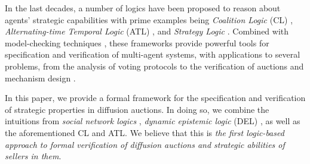 \documentclass[letterpaper]{article} %
\theoremstyle{definition}
\newcommand{\munyque}[1]{{[\color{red}#1]}}
\newcommand{\laurent}[1]{{[\color{purple}#1]}}
\begin{document}
In the last decades, a number of logics have been proposed to reason about agents' %
strategic capabilities with prime examples being %
\textit{Coalition Logic} (CL) \cite{pauly02},   \textit{Alternating-time Temporal Logic} (ATL) \cite{alur2002}, and \textit{Strategy Logic}  \cite{MogaveroMPV14}.
Combined with model-checking techniques \cite{clarke2018handbook}, these frameworks provide powerful tools for specification and verification of multi-agent systems, with applications to several problems, from   %
the %
analysis of voting protocols \cite{BelardinelliCDJ21,JamrogaKM22} to the verification of auctions and  mechanism design \cite{MittelmannAIJ2025,MittelmannMMP23}.

In this paper, we provide a formal framework for the specification and verification of strategic properties in diffusion auctions. In doing so, we combine the intuitions from \textit{social network logics} \cite{minathesis}, \textit{dynamic epistemic logic} (DEL) \cite{hvdetal.del:2007}, as well as the aforementioned CL and ATL.  We believe that this is \textit{the first logic-based approach to formal verification of diffusion auctions and strategic abilities of sellers in them}.  

\end{document}
